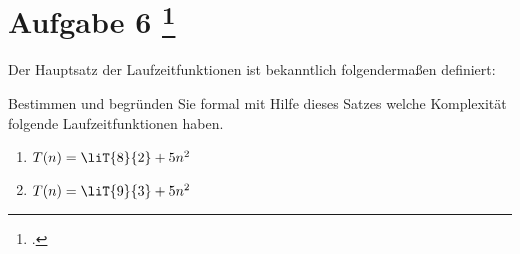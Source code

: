 \documentclass{lehramt-informatik-aufgabe}
\begin{document}
\let\O=\liO
\let\o=\liOmega
\let\T=\liT
\let\t=\liTheta

\section{Aufgabe 6
\footcite{66115:2019:09}}

Der Hauptsatz der Laufzeitfunktionen ist bekanntlich folgendermaßen
definiert:

Bestimmen und begründen Sie formal mit Hilfe dieses Satzes welche
Komplexität folgende Laufzeitfunktionen haben.

\begin{enumerate}


\item $T(n) = \T{8}{2} + 5n^2$



\item $T(n) = \T{9}{3} + 5n^2$

\end{enumerate}
\end{document}
